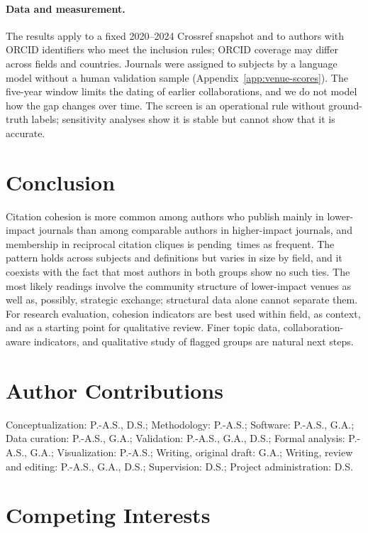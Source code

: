 \documentclass[12pt]{article}
\providecommand{\CliqueMembershipRatio}{pending}
\begin{document}
\paragraph{Data and measurement.}  The results apply to a fixed 2020--2024 Crossref snapshot and to authors with ORCID identifiers who meet the inclusion rules; ORCID coverage may differ across fields and countries.  Journals were assigned to subjects by a language model without a human validation sample (Appendix~\ref{app:venue-scores}).  The five-year window limits the dating of earlier collaborations, and we do not model how the gap changes over time.  The screen is an operational rule without ground-truth labels; sensitivity analyses show it is stable but cannot show that it is accurate.

\section{Conclusion}
\label{sec:conclusion}

Citation cohesion is more common among authors who publish mainly in lower-impact journals than among comparable authors in higher-impact journals, and membership in reciprocal citation cliques is \CliqueMembershipRatio\ times as frequent.  The pattern holds across subjects and definitions but varies in size by field, and it coexists with the fact that most authors in both groups show no such ties.  The most likely readings involve the community structure of lower-impact venues as well as, possibly, strategic exchange; structural data alone cannot separate them.  For research evaluation, cohesion indicators are best used within field, as context, and as a starting point for qualitative review.  Finer topic data, collaboration-aware indicators, and qualitative study of flagged groups are natural next steps.

\section{Author Contributions}

Conceptualization: P.-A.S., D.S.; Methodology: P.-A.S.; Software: P.-A.S., G.A.; Data curation: P.-A.S., G.A.; Validation: P.-A.S., G.A., D.S.; Formal analysis: P.-A.S., G.A.; Visualization: P.-A.S.; Writing, original draft: G.A.; Writing, review and editing: P.-A.S., G.A., D.S.; Supervision: D.S.; Project administration: D.S.

\section{Competing Interests}
\end{document}
